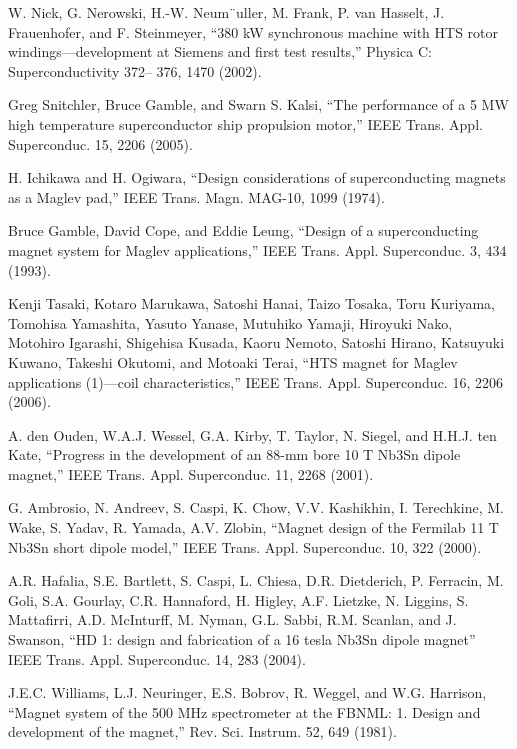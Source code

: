 \noindent [3.49] W. Nick, G. Nerowski, H.-W. Neum¨uller, M. Frank, P. van Hasselt, J. Frauenhofer, and F. Steinmeyer, ``380 kW synchronous machine with HTS rotor windings---development at Siemens and first test results,” Physica C: Superconductivity 372–
376, 1470 (2002).

\noindent [3.50] Greg Snitchler, Bruce Gamble, and Swarn S. Kalsi, ``The performance of a 5 MW high temperature superconductor ship propulsion motor,” IEEE Trans. Appl. Superconduc. 15, 2206 (2005).

\noindent [3.51] H. Ichikawa and H. Ogiwara, ``Design considerations of superconducting magnets as a Maglev pad,” IEEE Trans. Magn. MAG-10, 1099 (1974).

\noindent [3.52] Bruce Gamble, David Cope, and Eddie Leung, ``Design of a superconducting magnet system for Maglev applications,” IEEE Trans. Appl. Superconduc. 3, 434
(1993).

\noindent [3.53] Kenji Tasaki, Kotaro Marukawa, Satoshi Hanai, Taizo Tosaka, Toru Kuriyama,
Tomohisa Yamashita, Yasuto Yanase, Mutuhiko Yamaji, Hiroyuki Nako, Motohiro
Igarashi, Shigehisa Kusada, Kaoru Nemoto, Satoshi Hirano, Katsuyuki Kuwano,
Takeshi Okutomi, and Motoaki Terai, ``HTS magnet for Maglev applications (1)---coil characteristics,” IEEE Trans. Appl. Superconduc. 16, 2206 (2006).

\noindent [3.54] A. den Ouden, W.A.J. Wessel, G.A. Kirby, T. Taylor, N. Siegel, and H.H.J. ten
Kate, ``Progress in the development of an 88-mm bore 10 T Nb3Sn dipole magnet,”
IEEE Trans. Appl. Superconduc. 11, 2268 (2001).

\noindent [3.55] G. Ambrosio, N. Andreev, S. Caspi, K. Chow, V.V. Kashikhin, I. Terechkine,
M. Wake, S. Yadav, R. Yamada, A.V. Zlobin, ``Magnet design of the Fermilab 11
T Nb3Sn short dipole model,” IEEE Trans. Appl. Superconduc. 10, 322 (2000).

\noindent [3.56] A.R. Hafalia, S.E. Bartlett, S. Caspi, L. Chiesa, D.R. Dietderich, P. Ferracin,
M. Goli, S.A. Gourlay, C.R. Hannaford, H. Higley, A.F. Lietzke, N. Liggins, S.
Mattafirri, A.D. McInturff, M. Nyman, G.L. Sabbi, R.M. Scanlan, and J. Swanson,
``HD 1: design and fabrication of a 16 tesla Nb3Sn dipole magnet” IEEE Trans.
Appl. Superconduc. 14, 283 (2004).

\noindent [3.57] J.E.C. Williams, L.J. Neuringer, E.S. Bobrov, R. Weggel, and W.G. Harrison,
``Magnet system of the 500 MHz spectrometer at the FBNML: 1. Design and
development of the magnet,” Rev. Sci. Instrum. 52, 649 (1981).

